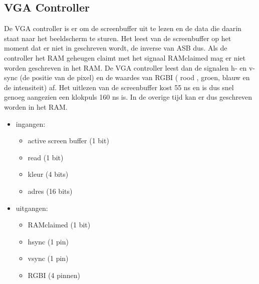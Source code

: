 \subsection{VGA Controller}
De VGA controller is er om de screenbuffer uit te lezen en de data die daarin staat naar het beeldscherm te sturen. Het leest van de screenbuffer op het moment dat er niet in geschreven wordt, de inverse van ASB dus. Als de controller het RAM geheugen claimt met het signaal RAMclaimed mag er niet worden geschreven in het RAM. De VGA controller leest dan de signalen h- en v-sync (de positie van de pixel) en de waardes van RGBI ( rood , groen, blauw en de intensiteit) af. Het uitlezen van de screenbuffer kost 55 ns en is dus snel genoeg aangezien een klokpuls 160 ns is. In de overige tijd kan er dus geschreven worden in het RAM.

\begin {itemize}
\item ingangen:
\begin {itemize}
\item active screen buffer (1 bit)
\item read (1 bit)
\item kleur (4 bits)
\item adres (16 bits)
\end {itemize}
\item uitgangen:
\begin {itemize}
\item RAMclaimed (1 bit)
\item hsync (1 pin)
\item vsync (1 pin)
\item RGBI (4 pinnen)
\end {itemize}
\end {itemize}
